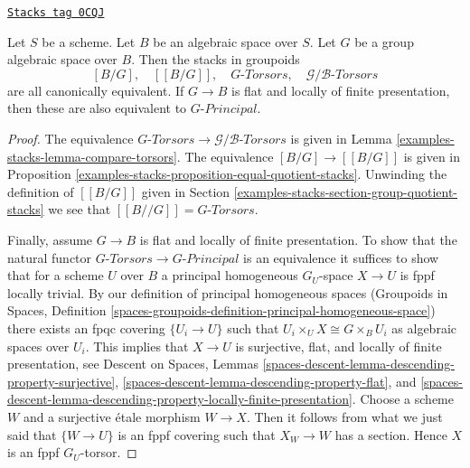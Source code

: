 \begin{lemma}
\label{examples-stacks-lemma-classifying-stacks}
\href{https://stacks.math.columbia.edu/tag/0CQJ}{\texttt{Stacks tag 0CQJ}}


Let $S$ be a scheme. Let $B$ be an algebraic space over $S$.
Let $G$ be a group algebraic space over $B$. Then the stacks
in groupoids
$$
[B/G],\quad
[[B/G]],\quad
G\textit{-Torsors},\quad
\mathcal{G}/\mathcal{B}\textit{-Torsors}
$$
are all canonically equivalent.
If $G \to B$ is flat and locally
of finite presentation, then these are also equivalent to
$G\textit{-Principal}$.
\end{lemma}

\begin{proof}
The equivalence
$G\textit{-Torsors} \to \mathcal{G}/\mathcal{B}\textit{-Torsors}$
is given in Lemma \ref{examples-stacks-lemma-compare-torsors}.
The equivalence $[B/G] \to [[B/G]]$ is given in
Proposition \ref{examples-stacks-proposition-equal-quotient-stacks}.
Unwinding the definition of $[[B/G]]$ given in
Section \ref{examples-stacks-section-group-quotient-stacks}
we see that $[[B//G]] = G\textit{-Torsors}$.

\medskip\noindent
Finally, assume $G \to B$ is flat and locally of finite presentation.
To show that the natural functor
$G\textit{-Torsors} \to G\textit{-Principal}$ is an equivalence
it suffices to show that for a scheme $U$ over $B$
a principal homogeneous $G_U$-space $X \to U$
is fppf locally trivial. By our definition of principal homogeneous spaces
(Groupoids in Spaces,
Definition \ref{spaces-groupoids-definition-principal-homogeneous-space})
there exists an fpqc covering $\{U_i \to U\}$ such that
$U_i \times_U X \cong G \times_B U_i$ as algebraic spaces over $U_i$.
This implies that $X \to U$ is surjective, flat, and locally of finite
presentation, see
Descent on Spaces, Lemmas
\ref{spaces-descent-lemma-descending-property-surjective},
\ref{spaces-descent-lemma-descending-property-flat}, and
\ref{spaces-descent-lemma-descending-property-locally-finite-presentation}.
Choose a scheme $W$ and a surjective \'etale morphism $W \to X$.
Then it follows from what we just said that $\{W \to U\}$ is an fppf covering
such that $X_W \to W$ has a section. Hence $X$ is an fppf $G_U$-torsor.
\end{proof}

